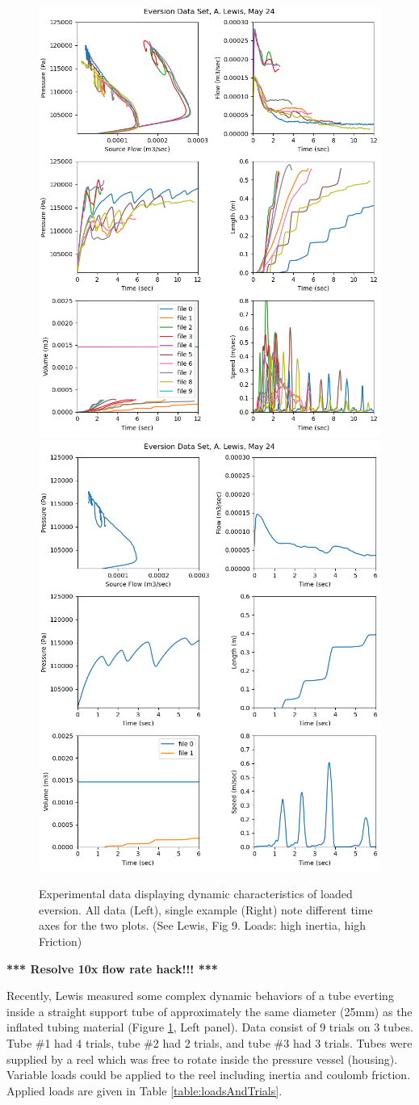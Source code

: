 \documentclass[letterpaper]{article}
\begin{document}
\begin{figure}[h]\centering
\includegraphics[width=.475\textwidth]{ExpDataExampleAll.png}
\includegraphics[width=.475\textwidth]{ExpDataExample.png}
\caption{Experimental data displaying dynamic characteristics of loaded eversion.  All data (Left), single example (Right) note different time axes for the two plots. (See Lewis, Fig 9. Loads: high inertia, high Friction)}
\label{Fig:experData}
\end{figure}

{\bf  ****    Resolve 10x flow rate hack!!!   *** }

Recently,  Lewis \cite{xxxx} measured some complex dynamic behaviors of a tube everting
inside
a straight support tube of approximately the same diameter (25mm)
as the inflated tubing material (Figure \ref{Fig:experData}, Left panel).
Data consist of 9 trials on 3 tubes.  Tube \#1 had 4 trials, tube \#2 had
2 trials, and tube \#3 had 3 trials.
Tubes were supplied by a reel which was free to rotate inside the pressure vessel (housing).
Variable loads could be applied to the reel including  inertia and coulomb friction.
Applied loads are given in Table \ref{table:loadsAndTrials}.
\end{document}
